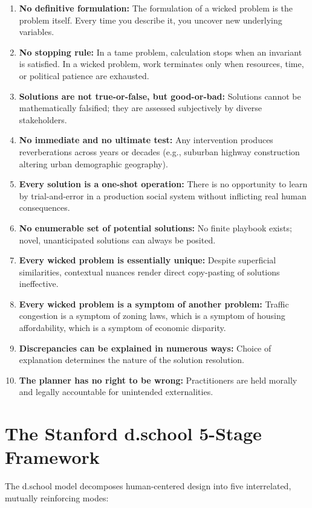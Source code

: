 \begin{definition}
\begin{enumerate}[leftmargin=1.5em]
    \item \textbf{No definitive formulation:} The formulation of a wicked problem is the problem itself. Every time you describe it, you uncover new underlying variables.
    \item \textbf{No stopping rule:} In a tame problem, calculation stops when an invariant is satisfied. In a wicked problem, work terminates only when resources, time, or political patience are exhausted.
    \item \textbf{Solutions are not true-or-false, but good-or-bad:} Solutions cannot be mathematically falsified; they are assessed subjectively by diverse stakeholders.
    \item \textbf{No immediate and no ultimate test:} Any intervention produces reverberations across years or decades (e.g., suburban highway construction altering urban demographic geography).
    \item \textbf{Every solution is a one-shot operation:} There is no opportunity to learn by trial-and-error in a production social system without inflicting real human consequences.
    \item \textbf{No enumerable set of potential solutions:} No finite playbook exists; novel, unanticipated solutions can always be posited.
    \item \textbf{Every wicked problem is essentially unique:} Despite superficial similarities, contextual nuances render direct copy-pasting of solutions ineffective.
    \item \textbf{Every wicked problem is a symptom of another problem:} Traffic congestion is a symptom of zoning laws, which is a symptom of housing affordability, which is a symptom of economic disparity.
    \item \textbf{Discrepancies can be explained in numerous ways:} Choice of explanation determines the nature of the solution resolution.
    \item \textbf{The planner has no right to be wrong:} Practitioners are held morally and legally accountable for unintended externalities.
\end{enumerate}
\end{definition}

\section{The Stanford d.school 5-Stage Framework}
The d.school model decomposes human-centered design into five interrelated, mutually reinforcing modes:

